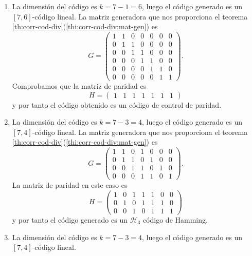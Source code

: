 \begin{example}
\begin{enumerate}
\[\begin{array}{rrrrrrr}
        0 & 0 & 0 & 0 & 0 & 1 & 0 \\
        0 & 0 & 0 & 0 & 0 & 0 & 1
        \end{array}\right).
    \]
    \item La dimensión del código es \(k = 7 - 1 = 6\), luego el código generado es un \([7, 6]\)-código lineal.
    La matriz generadora que nos proporciona el teorema \ref{th:corr-cod-div}(\ref{thi:corr-cod-div:mat-gen}) es \[
      G = \left(\begin{array}{rrrrrrr}
        1 & 1 & 0 & 0 & 0 & 0 & 0 \\
        0 & 1 & 1 & 0 & 0 & 0 & 0 \\
        0 & 0 & 1 & 1 & 0 & 0 & 0 \\
        0 & 0 & 0 & 1 & 1 & 0 & 0 \\
        0 & 0 & 0 & 0 & 1 & 1 & 0 \\
        0 & 0 & 0 & 0 & 0 & 1 & 1
        \end{array}\right).
    \]
    Comprobamos que la matriz de paridad es \[
      H = \left(\begin{array}{rrrrrrr}
        1 & 1 & 1 & 1 & 1 & 1 & 1
        \end{array}\right)
    \]
    y por tanto el código obtenido es un código de control de paridad.
    \item La dimensión del código es \(k = 7 - 3 = 4\), luego el código generado es un \([7, 4]\)-código lineal.
    La matriz generadora que nos proporciona el teorema \ref{th:corr-cod-div}(\ref{thi:corr-cod-div:mat-gen}) es \[
      G = \left(\begin{array}{rrrrrrr}
        1 & 1 & 0 & 1 & 0 & 0 & 0 \\
        0 & 1 & 1 & 0 & 1 & 0 & 0 \\
        0 & 0 & 1 & 1 & 0 & 1 & 0 \\
        0 & 0 & 0 & 1 & 1 & 0 & 1
        \end{array}\right).
    \]
    La matriz de paridad en este caso es \[
      H = \left(\begin{array}{rrrrrrr}
        1 & 0 & 1 & 1 & 1 & 0 & 0 \\
        0 & 1 & 0 & 1 & 1 & 1 & 0 \\
        0 & 0 & 1 & 0 & 1 & 1 & 1
        \end{array}\right)
    \]
    y por tanto el código generado es un \(\mathcal H_3\) código de Hamming.
    \item La dimensión del código es \(k = 7 - 3 = 4\), luego el código generado es un \([7, 4]\)-código lineal.

\end{enumerate}
\end{example}
